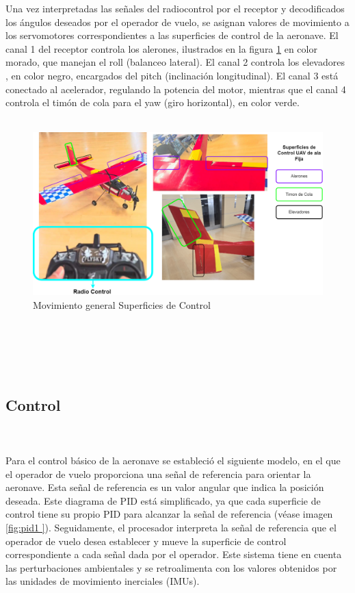 Una vez interpretadas las señales del radiocontrol por el receptor y decodificados los ángulos deseados por el operador de vuelo, se asignan valores de movimiento a los servomotores correspondientes a las superficies de control de la aeronave. El canal 1 del receptor controla los alerones, ilustrados en la figura \ref{fig:mov-Superficies } en color morado, que manejan el roll (balanceo lateral). El canal 2 controla los elevadores , en color negro, encargados del pitch (inclinación longitudinal). El canal 3 está conectado al acelerador, regulando la potencia del motor, mientras que el canal 4 controla el timón de cola para el yaw (giro horizontal), en color verde.
\\ \\
\begin{figure}[H]
    \centering
    \includegraphics[width=\textwidth]{Imagenes/Firmware/Superficies de Control.png}
    \caption{Movimiento general Superficies de Control }
    \label{fig:mov-Superficies }
\end{figure} \\ \\

\\ \\
\subsection{Control} \\ \\

Para el control básico de la aeronave se estableció el siguiente modelo, en el que el operador de vuelo proporciona una señal de referencia para orientar la aeronave. Esta señal de referencia es un valor angular que indica la posición deseada. Este diagrama de PID está simplificado, ya que cada superficie de control tiene su propio PID para alcanzar la señal de referencia (véase imagen \ref{fig:pid1 }). Seguidamente, el procesador interpreta la señal de referencia que el operador de vuelo desea establecer y mueve la superficie de control correspondiente a cada señal dada por el operador. Este sistema tiene en cuenta las perturbaciones ambientales y se retroalimenta con los valores obtenidos por las unidades de movimiento inerciales (IMUs).


